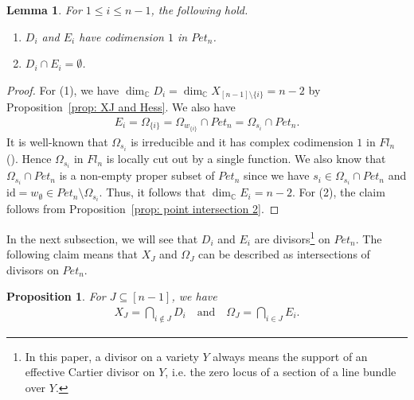 \documentclass[11pt]{article}
\newtheorem{lemma}[theo]{Lemma}
\newtheorem{prop}[theo]{Proposition}
\theoremstyle{definition}
\numberwithin{equation}{section}
\numberwithin{equation}{section}
\begin{document}
\begin{lemma}\label{lem: divisors}
For $1\le i\le n-1$, the following hold. 
\begin{enumerate}
 \item $D_{i}$ and $E_{i}$ have codimension $1$ in $Pet_{n}$.
 \item $D_{i}\cap E_{i} = \emptyset$.
\end{enumerate}
\end{lemma}

\begin{proof}
For (1), we have $\dim_{{\mathbb C}}D_i=\dim_{{\mathbb C}} X_{[n-1]\setminus\{i\}} =n-2$ by Proposition~\ref{prop: XJ and Hess}. We also have 
\begin{align*}
E_{i} = \Omega_{\{i\}} = \Omega_{w_{\{i\}}}\cap Pet_{n}= \Omega_{s_i}\cap Pet_{n} .
\end{align*}
It is well-known that $\Omega_{s_i}$ is irreducible and it has complex codimension $1$ in $Fl_n$ (\cite[Sect.\ 10.2]{fult97}). Hence $\Omega_{s_i}$ in $Fl_n$ is locally cut out by a single function. We also know that $\Omega_{s_i}\cap Pet_{n}$ is a non-empty proper subset of $Pet_{n}$ since we have $s_i\in \Omega_{s_i}\cap Pet_{n}$ and $\text{id}=w_{\emptyset}\in Pet_{n}\setminus\Omega_{s_i}$. Thus, it follows that $\dim_{{\mathbb C}}E_{i} =n-2$. For (2), the claim follows from Proposition~\ref{prop: point intersection 2}.
\end{proof}

In the next subsection, we will see that $D_i$ and $E_i$ are divisors\footnote{In this paper, a divisor on a variety $Y$ always means the support of an effective Cartier divisor on $Y$, i.e. the zero locus of a section of a line bundle over $Y$.} on $Pet_{n}$. The following claim means that $X_J$ and $\Omega_J$ can be described as intersections of divisors on $Pet_{n}$.

\begin{prop}\label{prop: divisor expression}
For $J\subseteq [n-1]$, we have
\begin{align}\label{eq: div exp 10}
X_{J} =\bigcap_{i\notin J} D_i
\quad \text{and} \quad
\Omega_{J} = \bigcap_{i\in J} E_i .
\end{align}
\end{prop}
\end{document}

